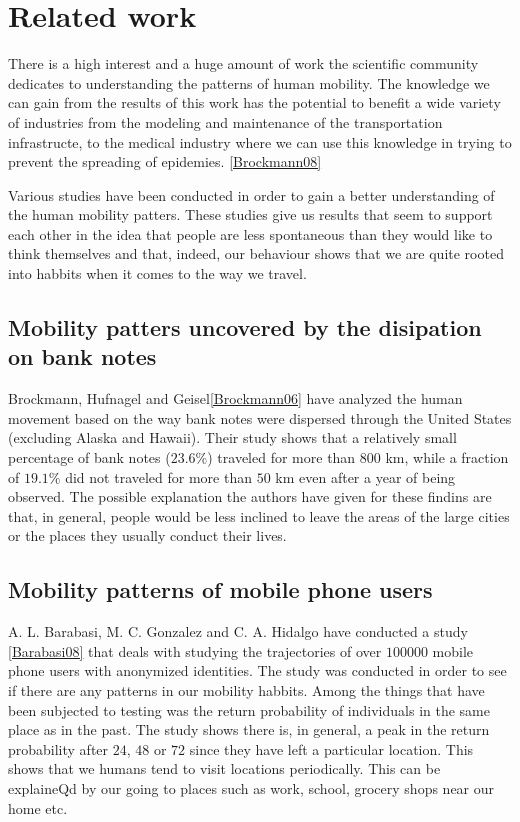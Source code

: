 \chapter{Related work}

There is a high interest and a huge amount of work the scientific community
dedicates to understanding the patterns of human mobility. The knowledge we
can gain from the results of this work has the potential to benefit a wide
variety of industries from the modeling and maintenance of the transportation infrastructe,
to the medical industry where we can use this knowledge in trying to prevent the
spreading of epidemies. \ref{Brockmann08} %

Various studies have been conducted in order to gain a better understanding of
the human mobility patters. These studies give us results that seem to support
each other in the idea that people are less spontaneous than they would like to
think themselves and that, indeed, our behaviour shows that we are quite rooted
into habbits when it comes to the way we travel.

\section{Mobility patters uncovered by the disipation on bank notes}
Brockmann, Hufnagel and Geisel\ref{Brockmann06} have
analyzed the human movement based on the way bank notes were dispersed through
the United States (excluding Alaska and Hawaii). Their study shows that a
relatively small percentage of bank notes ($23.6\%$) traveled for more than
$800$ km, while a fraction of $19.1\%$ did not traveled for more than $50$ km
even after a year of being observed. The possible explanation the authors have
given for these findins are that, in general, people would be less inclined to
leave the areas of the large cities or the places they usually conduct their
lives.

\section{Mobility patterns of mobile phone users}
A. L. Barabasi, M. C. Gonzalez and C. A. Hidalgo have conducted a study
\ref{Barabasi08} that deals with studying the trajectories of over $100000$
mobile phone users with anonymized identities. The study was conducted in order
to see if there are any patterns in our mobility habbits. Among the things that
have been subjected to testing was the return probability of individuals in the
same place as in the past. The study shows there is, in general, a peak in the
return probability after $24$, $48$ or $72$ since they have left a particular
location. This shows that we humans tend to visit locations periodically. This
can be explaineQd by our going to places such as work, school, grocery shops
near our home etc.

